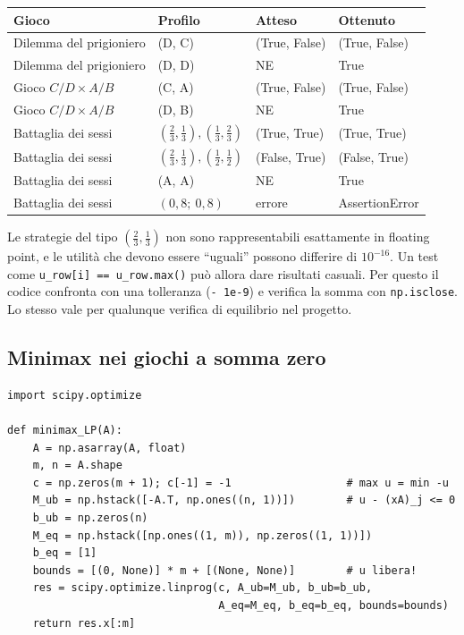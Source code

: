 \begin{center}
\renewcommand{\arraystretch}{1.2}
\small
\begin{tabular}{llll}
\toprule
Gioco & Profilo & Atteso & Ottenuto \\
\midrule
Dilemma del prigioniero & (D, C) & (True, False) & (True, False) \\
Dilemma del prigioniero & (D, D) & NE & True \\
Gioco $C/D \times A/B$  & (C, A) & (True, False) & (True, False) \\
Gioco $C/D \times A/B$  & (D, B) & NE & True \\
Battaglia dei sessi     & $(\frac23,\frac13), (\frac13,\frac23)$ & (True, True) & (True, True) \\
Battaglia dei sessi     & $(\frac23,\frac13), (\frac12,\frac12)$ & (False, True) & (False, True) \\
Battaglia dei sessi     & (A, A) & NE & True \\
Battaglia dei sessi     & $(0{,}8;\ 0{,}8)$ & errore & AssertionError \\
\bottomrule
\end{tabular}
\end{center}

\begin{attenzione}
Le strategie del tipo $(\tfrac23, \tfrac13)$ non sono rappresentabili esattamente in
floating point, e le utilità che devono essere ``uguali'' possono differire di
$10^{-16}$. Un test come \texttt{u\_row[i] == u\_row.max()} può allora dare risultati
casuali. Per questo il codice confronta con una tolleranza (\texttt{- 1e-9}) e verifica la
somma con \texttt{np.isclose}. Lo stesso vale per qualunque verifica di equilibrio nel
progetto.
\end{attenzione}

\subsection{Minimax nei giochi a somma zero}

\begin{lstlisting}
import scipy.optimize

def minimax_LP(A):
    A = np.asarray(A, float)
    m, n = A.shape
    c = np.zeros(m + 1); c[-1] = -1                  # max u = min -u
    M_ub = np.hstack([-A.T, np.ones((n, 1))])        # u - (xA)_j <= 0
    b_ub = np.zeros(n)
    M_eq = np.hstack([np.ones((1, m)), np.zeros((1, 1))])
    b_eq = [1]
    bounds = [(0, None)] * m + [(None, None)]        # u libera!
    res = scipy.optimize.linprog(c, A_ub=M_ub, b_ub=b_ub,
                                 A_eq=M_eq, b_eq=b_eq, bounds=bounds)
    return res.x[:m]
\end{lstlisting}

